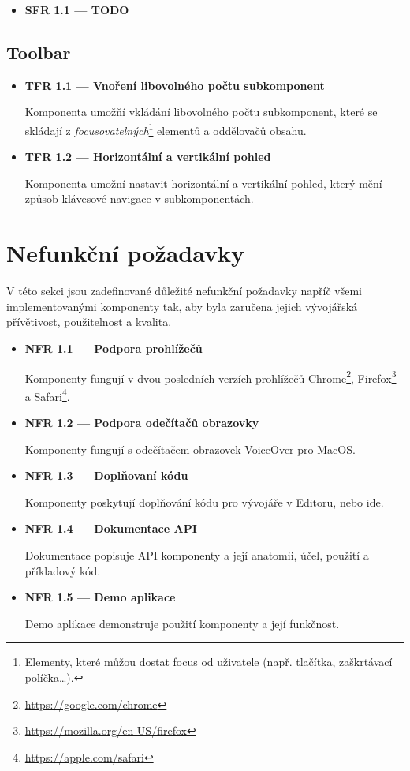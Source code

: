 \begin{itemize}
    \item \textbf{SFR 1.1 --- TODO}
\end{itemize}

\subsection{Toolbar}

\begin{itemize}
    \item \textbf{TFR 1.1 --- Vnoření libovolného počtu subkomponent}\label{tfr11}

          Komponenta umožňí vkládání libovolného počtu subkomponent, které se skládají z \textit{focusovatelných}\footnote{Elementy, které můžou dostat focus od uživatele (např. tlačítka, zaškrtávací políčka\dots).} elementů a oddělovačů obsahu.

    \item \textbf{TFR 1.2 --- Horizontální a vertikální pohled}\label{tfr12}

          Komponenta umožní nastavit horizontální a vertikální pohled, který mění způsob klávesové navigace v subkomponentách.
\end{itemize}

\section{Nefunkční požadavky}

V této sekci jsou zadefinované důležité nefunkční požadavky napříč všemi implementovanými komponenty tak, aby byla zaručena jejich vývojářská přívětivost, použitelnost a kvalita.

\begin{itemize}
    \item \textbf{NFR 1.1 --- Podpora prohlížečů}

          Komponenty fungují v dvou posledních verzích prohlížečů Chrome\footnote{\url{https://google.com/chrome}}, Firefox\footnote{\url{https://mozilla.org/en-US/firefox}} a Safari\footnote{\url{https://apple.com/safari}}.

    \item \textbf{NFR 1.2 --- Podpora odečítačů obrazovky}

          Komponenty fungují s odečítačem obrazovek VoiceOver pro MacOS.

    \item \textbf{NFR 1.3 --- Doplňovaní kódu}

          Komponenty poskytují doplňování kódu pro vývojáře v Editoru, nebo \gls{ide}.

    \item \textbf{NFR 1.4 --- Dokumentace API}

          Dokumentace popisuje API komponenty a její anatomii, účel, použití a příkladový kód.

    \item \textbf{NFR 1.5 --- Demo aplikace}

          Demo aplikace demonstruje použití komponenty a její funkčnost.
\end{itemize}

